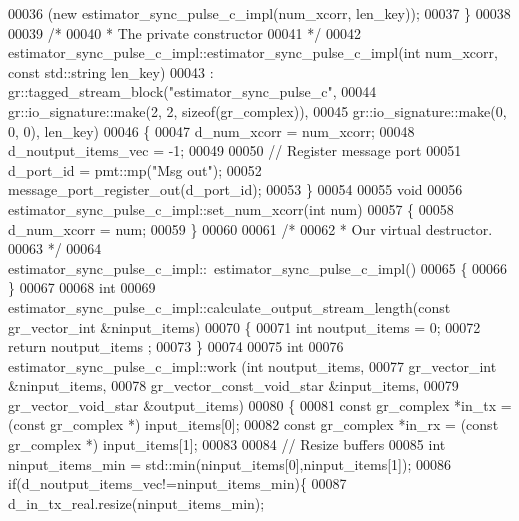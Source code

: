 \begin{DoxyCode}
00036         (\textcolor{keyword}{new} estimator_sync_pulse_c_impl(num\_xcorr, len\_key));
00037     \}
00038 
00039     \textcolor{comment}{/*}
00040 \textcolor{comment}{     * The private constructor}
00041 \textcolor{comment}{     */}
00042     estimator_sync_pulse_c_impl::estimator_sync_pulse_c_impl(\textcolor{keywordtype}{int} num\_xcorr, \textcolor{keyword}{const} 
      std::string len\_key)
00043       : gr::tagged\_stream\_block(\textcolor{stringliteral}{"estimator\_sync\_pulse\_c"},
00044               gr::io\_signature::make(2, 2, sizeof(gr\_complex)),
00045               gr::io\_signature::make(0, 0, 0), len\_key)
00046     \{
00047         d_num_xcorr = num\_xcorr;
00048         d_noutput_items_vec = -1;
00049         
00050         \textcolor{comment}{// Register message port}
00051         d_port_id = pmt::mp(\textcolor{stringliteral}{"Msg out"});
00052         message\_port\_register\_out(d_port_id);
00053     \}
00054     
00055     \textcolor{keywordtype}{void}
00056     estimator_sync_pulse_c_impl::set_num_xcorr(\textcolor{keywordtype}{int} num)
00057     \{
00058       d_num_xcorr = num;
00059     \}
00060 
00061     \textcolor{comment}{/*}
00062 \textcolor{comment}{     * Our virtual destructor.}
00063 \textcolor{comment}{     */}
00064     estimator_sync_pulse_c_impl::~estimator_sync_pulse_c_impl()
00065     \{
00066     \}
00067 
00068     \textcolor{keywordtype}{int}
00069     estimator_sync_pulse_c_impl::calculate_output_stream_length(\textcolor{keyword}{const} gr\_vector\_int &ninput\_items)
00070     \{
00071       \textcolor{keywordtype}{int} noutput\_items = 0;
00072       \textcolor{keywordflow}{return} noutput\_items ;
00073     \}
00074 
00075     \textcolor{keywordtype}{int}
00076     estimator_sync_pulse_c_impl::work (\textcolor{keywordtype}{int} noutput\_items,
00077                        gr\_vector\_int &ninput\_items,
00078                        gr\_vector\_const\_void\_star &input\_items,
00079                        gr\_vector\_void\_star &output\_items)
00080     \{
00081         \textcolor{keyword}{const} gr\_complex *in\_tx = (\textcolor{keyword}{const} gr\_complex *) input\_items[0];
00082         \textcolor{keyword}{const} gr\_complex *in\_rx = (\textcolor{keyword}{const} gr\_complex *) input\_items[1];
00083         
00084         \textcolor{comment}{// Resize buffers}
00085         \textcolor{keywordtype}{int} ninput\_items\_min = std::min(ninput\_items[0],ninput\_items[1]);
00086         \textcolor{keywordflow}{if}(d_noutput_items_vec!=ninput\_items\_min)\{
00087             d_in_tx_real.resize(ninput\_items\_min);

\end{DoxyCode}
